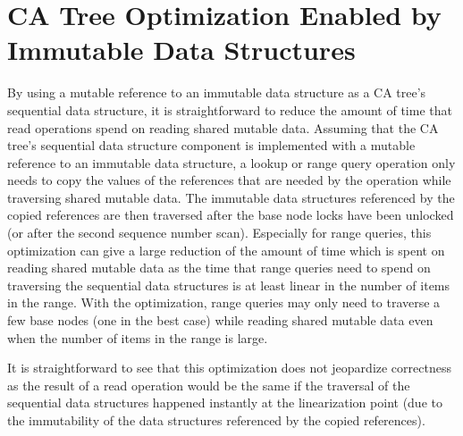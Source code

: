 \documentclass[a4paper,UKenglish]{oasics-v2016}
\begin{document}
\section{CA Tree Optimization Enabled by Immutable Data Structures\label{immopt}}
By using a mutable reference to an immutable data structure as a CA tree's sequential data structure,
it is straightforward to reduce the amount of time that read operations spend on reading shared mutable data. %
Assuming that the CA tree's sequential data structure component is implemented with a mutable reference to an immutable data structure,
a lookup or range query operation only needs to copy the values of the references that are needed by the operation while traversing shared mutable data. %
The immutable data structures referenced by the copied references are then traversed after the base node locks have been unlocked (or after the second sequence number scan).
Especially for range queries, this optimization can give a large reduction of the amount of time which is spent on reading shared mutable data as the time that range queries need to spend on traversing the sequential data structures is at least linear in the number of items in the range.
With the optimization, range queries may only need to traverse a few base nodes (one in the best case) while reading shared mutable data even when the number of items in the range is large. 

It is straightforward to see that this optimization does not jeopardize correctness as the result of a read operation would be the same if the traversal of the sequential data structures happened instantly at the linearization point (due to the immutability of the data structures referenced by the copied references). %
\end{document}
